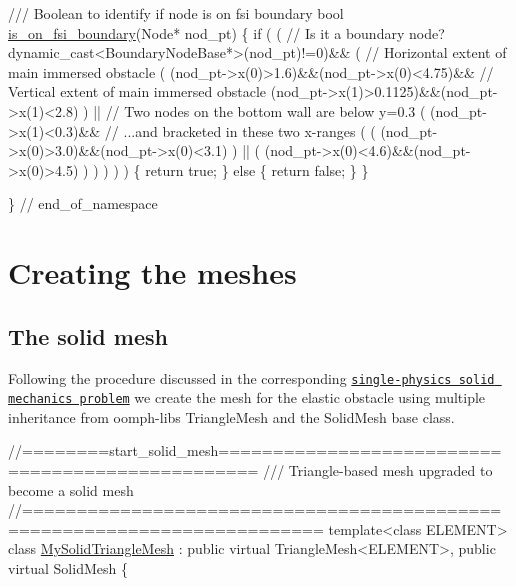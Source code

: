 \begin{DoxyCodeInclude}
\textcolor{comment}{}
\textcolor{comment}{ /// Boolean to identify if node is on fsi boundary}
\textcolor{comment}{} \textcolor{keywordtype}{bool} \hyperlink{namespaceGlobal__Parameters_a655abf819eb3045dac883f2b7073ba22}{is\_on\_fsi\_boundary}(Node* nod\_pt)
 \{
  \textcolor{keywordflow}{if} (
   (
    \textcolor{comment}{// Is it a boundary node?}
    dynamic\_cast<BoundaryNodeBase*>(nod\_pt)!=0)&&
   (
    \textcolor{comment}{// Horizontal extent of main immersed obstacle}
    (  (nod\_pt->x(0)>1.6)&&(nod\_pt->x(0)<4.75)&&
       \textcolor{comment}{// Vertical extent of main immersed obstacle}
       (nod\_pt->x(1)>0.1125)&&(nod\_pt->x(1)<2.8) ) ||
    \textcolor{comment}{// Two nodes on the bottom wall are below y=0.3}
    (  (nod\_pt->x(1)<0.3)&&
       \textcolor{comment}{// ...and bracketed in these two x-ranges}
       (  ( (nod\_pt->x(0)>3.0)&&(nod\_pt->x(0)<3.1) ) ||
          ( (nod\_pt->x(0)<4.6)&&(nod\_pt->x(0)>4.5) )   ) 
     )
    )
   )
   \{
    \textcolor{keywordflow}{return} \textcolor{keyword}{true};
   \}
  \textcolor{keywordflow}{else}
   \{
    \textcolor{keywordflow}{return} \textcolor{keyword}{false};
   \}
 \}


\} \textcolor{comment}{// end\_of\_namespace}

\end{DoxyCodeInclude}




 

\hypertarget{index_mesh_code}{}\section{Creating the meshes}\label{index_mesh_code}
\hypertarget{index_solid_mesh}{}\subsection{The solid mesh}\label{index_solid_mesh}
Following the procedure discussed in the corresponding \href{../../../solid/unstructured_solid/html/index.html}{\tt single-\/physics solid mechanics problem} we create the mesh for the elastic obstacle using multiple inheritance from {\ttfamily oomph-\/lib\textquotesingle{}s} {\ttfamily Triangle\+Mesh} and the {\ttfamily Solid\+Mesh} base class.


\begin{DoxyCodeInclude}
\textcolor{comment}{//========start\_solid\_mesh=================================================}
\textcolor{comment}{/// Triangle-based mesh upgraded to become a solid mesh}
\textcolor{comment}{}\textcolor{comment}{//=========================================================================}
\textcolor{keyword}{template}<\textcolor{keyword}{class} ELEMENT>
\textcolor{keyword}{class }\hyperlink{classMySolidTriangleMesh}{MySolidTriangleMesh} : \textcolor{keyword}{public} \textcolor{keyword}{virtual} TriangleMesh<ELEMENT>, 
                          \textcolor{keyword}{public} \textcolor{keyword}{virtual} SolidMesh 
\{

\end{DoxyCodeInclude}


